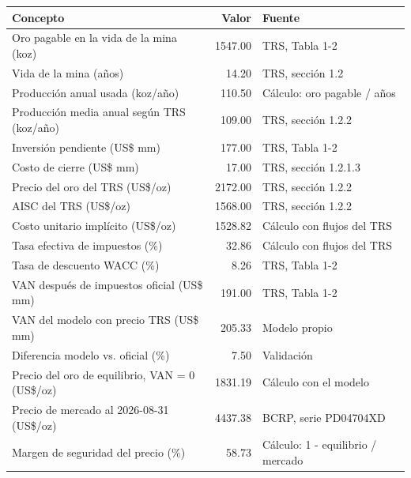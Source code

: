 \begin{tabular}{lrl}
\toprule
Concepto & Valor & Fuente \\
\midrule
Oro pagable en la vida de la mina (koz) & 1547.00 & TRS, Tabla 1-2 \\
Vida de la mina (años) & 14.20 & TRS, sección 1.2 \\
Producción anual usada (koz/año) & 110.50 & Cálculo: oro pagable / años \\
Producción media anual según TRS (koz/año) & 109.00 & TRS, sección 1.2.2 \\
Inversión pendiente (US\$ mm) & 177.00 & TRS, Tabla 1-2 \\
Costo de cierre (US\$ mm) & 17.00 & TRS, sección 1.2.1.3 \\
Precio del oro del TRS (US\$/oz) & 2172.00 & TRS, sección 1.2.2 \\
AISC del TRS (US\$/oz) & 1568.00 & TRS, sección 1.2.2 \\
Costo unitario implícito (US\$/oz) & 1528.82 & Cálculo con flujos del TRS \\
Tasa efectiva de impuestos (\%) & 32.86 & Cálculo con flujos del TRS \\
Tasa de descuento WACC (\%) & 8.26 & TRS, Tabla 1-2 \\
VAN después de impuestos oficial (US\$ mm) & 191.00 & TRS, Tabla 1-2 \\
VAN del modelo con precio TRS (US\$ mm) & 205.33 & Modelo propio \\
Diferencia modelo vs. oficial (\%) & 7.50 & Validación \\
Precio del oro de equilibrio, VAN = 0 (US\$/oz) & 1831.19 & Cálculo con el modelo \\
Precio de mercado al 2026-08-31 (US\$/oz) & 4437.38 & BCRP, serie PD04704XD \\
Margen de seguridad del precio (\%) & 58.73 & Cálculo: 1 - equilibrio / mercado \\
\bottomrule
\end{tabular}
